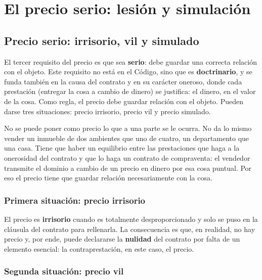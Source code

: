 \documentclass[12pt,oneside]{book}
\begin{document}
\chapter[Precio serio: lesi\'on y simulaci\'on]{El precio serio: lesi\'on y simulaci\'on}

\section{Precio serio: irrisorio, vil y simulado}

El tercer requisito del precio es que sea \textbf{serio}: debe guardar una correcta relaci\'on con el objeto. Este requisito no est\'a en el C\'odigo, sino que es \textbf{doctrinario}, y se funda tambi\'en en la causa del contrato y en su car\'acter oneroso, donde cada prestaci\'on (entregar la cosa a cambio de dinero) se justifica: el dinero, en el valor de la cosa. Como regla, el precio debe guardar relaci\'on con el objeto. Pueden darse tres situaciones: precio irrisorio, precio vil y precio simulado.

\begin{important}
No se puede poner como precio lo que a una parte se le ocurra. No da lo mismo vender un inmueble de dos ambientes que uno de cuatro, un departamento que una casa. Tiene que haber un equilibrio entre las prestaciones que haga a la onerosidad del contrato y que lo haga un contrato de compraventa: el vendedor transmite el dominio a cambio de un precio en dinero por esa cosa puntual. Por eso el precio tiene que guardar relaci\'on necesariamente con la cosa.
\end{important}

\subsection{Primera situaci\'on: precio irrisorio}

El precio es \textbf{irrisorio} cuando es totalmente desproporcionado y solo se puso en la cl\'ausula del contrato para rellenarla. La consecuencia es que, en realidad, no hay precio y, por ende, puede declararse la \textbf{nulidad} del contrato por falta de un elemento esencial: la contraprestaci\'on, en este caso, el precio.

\subsection{Segunda situaci\'on: precio vil}
\end{document}

